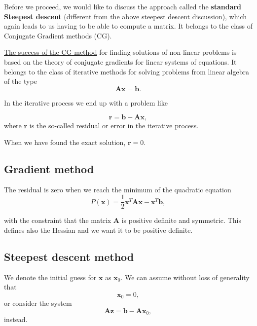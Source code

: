 \documentclass[%
oneside,                 %
final,                   %
10pt]{article}
\begin{document}
Before we proceed, we would like to discuss the approach called the
\textbf{standard Steepest descent} (different from the above steepest descent discussion), which again leads to us having to be able
to compute a matrix. It belongs to the class of Conjugate Gradient methods (CG).

\href{{https://www.cs.cmu.edu/~quake-papers/painless-conjugate-gradient.pdf}}{The success of the CG method}
for finding solutions of non-linear problems is based on the theory
of conjugate gradients for linear systems of equations. It belongs to
the class of iterative methods for solving problems from linear
algebra of the type 
\begin{equation*} 
\bm{A}\bm{x} = \bm{b}.
\end{equation*} 

In the iterative process we end up with a problem like

\begin{equation*}
  \bm{r}= \bm{b}-\bm{A}\bm{x},
\end{equation*}
where $\bm{r}$ is the so-called residual or error in the iterative process.

When we have found the exact solution, $\bm{r}=0$.

\subsection{Gradient method}

The residual is zero when we reach the minimum of the quadratic equation
\begin{equation*}
  P(\bm{x})=\frac{1}{2}\bm{x}^T\bm{A}\bm{x} - \bm{x}^T\bm{b},
\end{equation*}

with the constraint that the matrix $\bm{A}$ is positive definite and
symmetric.  This defines also the Hessian and we want it to be  positive definite.  


\subsection{Steepest descent  method}

We denote the initial guess for $\bm{x}$ as $\bm{x}_0$. 
We can assume without loss of generality that
\begin{equation*}
\bm{x}_0=0,
\end{equation*}
or consider the system
\begin{equation*}
\bm{A}\bm{z} = \bm{b}-\bm{A}\bm{x}_0,
\end{equation*}
instead.
\end{document}
